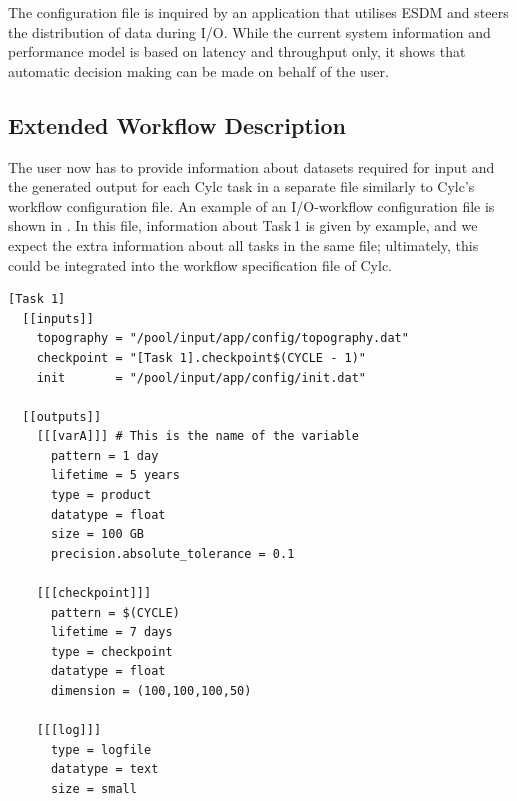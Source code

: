 \documentclass{superfri}
\begin{document}
The configuration file is inquired by an application that utilises ESDM and steers the distribution of data during I/O.
While the current system information and performance model is based on latency and throughput only, it shows that automatic decision making can be made on behalf of the user.

\subsection{Extended Workflow Description}

The user now has to provide information about datasets required for input and the generated output for each Cylc task in a separate file similarly to Cylc's workflow configuration file.
An example of an I/O-workflow configuration file is shown in . In this file, information about Task\,1 is given by example, and we expect the extra information about all tasks in the same file; ultimately, this could be integrated into the workflow specification file of Cylc.

\begin{lstlisting}[caption = External Cylc I/O-workflow configuration file, label=lst:cylc]
[Task 1]
  [[inputs]]
    topography = "/pool/input/app/config/topography.dat"
    checkpoint = "[Task 1].checkpoint$(CYCLE - 1)"
    init       = "/pool/input/app/config/init.dat"

  [[outputs]]
    [[[varA]]] # This is the name of the variable
      pattern = 1 day
      lifetime = 5 years
      type = product
      datatype = float
      size = 100 GB
      precision.absolute_tolerance = 0.1

    [[[checkpoint]]]
      pattern = $(CYCLE)
      lifetime = 7 days
      type = checkpoint
      datatype = float
      dimension = (100,100,100,50)

    [[[log]]]
      type = logfile
      datatype = text
      size = small
\end{lstlisting}
\end{document}
